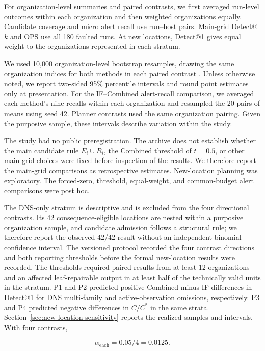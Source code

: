 \documentclass[sn-basic]{sn-jnl}%
\theoremstyle{thmstyleone}%
\theoremstyle{thmstyletwo}%
\theoremstyle{thmstylethree}%
\begin{document}
For organization-level summaries and paired contrasts, we first averaged run-level outcomes within each organization and then weighted organizations equally. Candidate coverage and micro alert recall use run--host pairs. Main-grid Detect@\(k\) and OPS use all 180 faulted runs. At new locations, Detect@1 gives equal weight to the organizations represented in each stratum.

We used 10,000 organization-level bootstrap resamples, drawing the same organization indices for both methods in each paired contrast \citep{davison1997,efron1979bootstrap}. Unless otherwise noted, we report two-sided 95\% percentile intervals and round point estimates only at presentation. For the IF--Combined alert-recall comparison, we averaged each method's nine recalls within each organization and resampled the 20 pairs of means using seed 42. Planner contrasts used the same organization pairing. Given the purposive sample, these intervals describe variation within the study.

The study had no public preregistration. The archive does not establish whether the main candidate rule \(E_i\cup R_i\), the Combined threshold of \(t=0.5\), or other main-grid choices were fixed before inspection of the results. We therefore report the main-grid comparisons as retrospective estimates. New-location planning was exploratory. The forced-zero, threshold, equal-weight, and common-budget alert comparisons were post hoc.

The DNS-only stratum is descriptive and is excluded from the four directional contrasts. Its 42 consequence-eligible locations are nested within a purposive organization sample, and candidate admission follows a structural rule; we therefore report the observed 42/42 result without an independent-binomial confidence interval. The versioned protocol recorded the four contrast directions and both reporting thresholds before the formal new-location results were recorded. The thresholds required paired results from at least 12 organizations and an affected leaf-repairable output in at least half of the technically valid units in the stratum. P1 and P2 predicted positive Combined-minus-IF differences in Detect@1 for DNS multi-family and active-observation omissions, respectively. P3 and P4 predicted negative differences in \(C/C^{*}\) in the same strata. Section~\ref{sec:new-location-sensitivity} reports the realized samples and intervals. With four contrasts,

\[
\alpha_{\mathrm{each}}=0.05/4=0.0125.
\]
\end{document}
